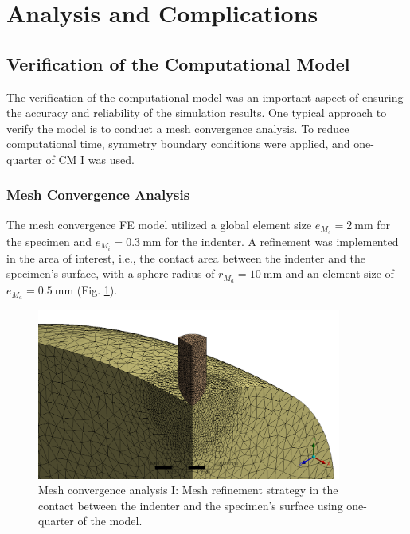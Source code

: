 \section{Analysis and Complications}
\label{section:challengescm}
\subsection*{Verification of the Computational Model}
The verification of the computational model was an important aspect of ensuring the accuracy and reliability of the 
simulation results. One typical approach to verify the model is to conduct a mesh convergence analysis. To 
reduce computational time, symmetry boundary conditions were applied, and one-quarter of CM I was used.

\subsubsection*{Mesh Convergence Analysis}
The mesh convergence FE model utilized a global element size $e_{M_s}=\SI{2}{\milli\meter}$ for the specimen
and $e_{M_i}=\SI{0.3}{\milli\meter}$ for the indenter.
A refinement was implemented in the area of interest, i.e., the contact area between the indenter and the specimen's surface,
with a sphere radius of $r_{M_a}=\SI{10}{\milli\meter}$ and an element size of $e_{M_a}=\SI{0.5}{\milli\meter}$ (Fig. \ref{fig:meshconvergencecmI}).

\begin{figure}%
    \centering
   \quad
   \includegraphics[width=10cm]{Images/computational/meshzoom.png}%
   \caption[Mesh convergence model I]{Mesh convergence analysis I: Mesh refinement strategy in the contact between the indenter and the specimen's surface using one-quarter of the model.}%
   \label{fig:meshconvergencecmI}%
\end{figure}


